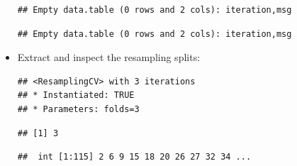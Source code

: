 \documentclass[
]{scrbook}
\newenvironment{Shaded}{\begin{snugshade}}{\end{snugshade}}
\newcommand{\DecValTok}[1]{\textcolor[rgb]{0.00,0.00,0.81}{#1}}
\newcommand{\FunctionTok}[1]{\textcolor[rgb]{0.00,0.00,0.00}{#1}}
\newcommand{\NormalTok}[1]{#1}
\newcommand{\SpecialCharTok}[1]{\textcolor[rgb]{0.00,0.00,0.00}{#1}}
\renewenvironment{Shaded} {\begin{snugshade}\small} {\end{snugshade}}
\begin{document}
\begin{itemize}
\begin{verbatim}
## Empty data.table (0 rows and 2 cols): iteration,msg
\end{verbatim}

\begin{Shaded}
\end{Shaded}

\begin{verbatim}
## Empty data.table (0 rows and 2 cols): iteration,msg
\end{verbatim}
\item
  Extract and inspect the resampling splits:

\begin{Shaded}
\end{Shaded}

\begin{verbatim}
## <ResamplingCV> with 3 iterations
## * Instantiated: TRUE
## * Parameters: folds=3
\end{verbatim}

\begin{Shaded}
\end{Shaded}

\begin{verbatim}
## [1] 3
\end{verbatim}

\begin{Shaded}
\end{Shaded}

\begin{verbatim}
##  int [1:115] 2 6 9 15 18 20 26 27 32 34 ...
\end{verbatim}

\begin{Shaded}
\end{Shaded}


\end{itemize}
\end{document}
